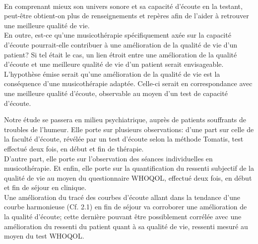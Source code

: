   \\
   En comprenant mieux son univers sonore et sa capacité 
  d'écoute en la testant, peut-être obtient-on plus de renseignements et repères afin de l'aider à 
  retrouver  une 
  meilleure qualité de vie.
\\
 En outre, est-ce qu'une musicothérapie spécifiquement axée sur la capacité d'écoute pourrait-elle  
 contribuer à une 
amélioration de la qualité de vie d'un patient? 
Si tel était  le cas, un lien étroit entre une amélioration de la 
qualité d'écoute  et une meilleure qualité de vie  d'un patient serait envisageable.
\\
L'hypothèse émise serait qu'une amélioration de la qualité de vie est la conséquence d'une 
musicothérapie 
adaptée. Celle-ci serait en correspondance avec une 
meilleure qualité d'écoute, observable au moyen d'un test de capacité d'écoute.


  Notre étude se passera  en milieu psychiatrique, 
auprès de patients souffrants de troubles de l'humeur.
 Elle porte sur plusieurs observations: d'une part sur celle de la faculté d'écoute, révélée par un test 
 d'écoute selon la méthode Tomatis, test effectué deux fois, en début et fin de thérapie.
\\
D'autre part, elle porte sur l'observation des séances individuelles en musicothérapie.
Et enfin, elle porte sur la quantification du ressenti subjectif de la qualité de vie au moyen du 
questionnaire WHOQOL, effectué deux fois, en début et fin de séjour en clinique.
\\
Une amélioration du tracé des courbes d'écoute allant dans la tendance d'une courbe harmonieuse (Cf. 
2.1) en fin de séjour va corroborer une amélioration de la qualité d'écoute; cette dernière pouvant être 
possiblement corrélée avec une amélioration du ressenti du patient quant à sa qualité de vie, ressenti 
mesuré au moyen du test WHOQOL.

